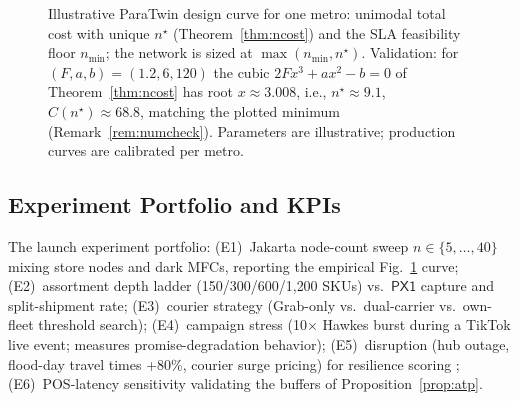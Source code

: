 \documentclass[journal]{IEEEtran}
\begin{document}
\begin{figure}[!t]
\centering
{}
\caption{Illustrative ParaTwin design curve for one metro: unimodal total cost with unique $n^\star$ (Theorem~\ref{thm:ncost}) and the SLA feasibility floor $n_{\min}$; the network is sized at $\max(n_{\min}, n^\star)$. Validation: for $(F,a,b)=(1.2,6,120)$ the cubic $2Fx^3 + ax^2 - b = 0$ of Theorem~\ref{thm:ncost} has root $x \approx 3.008$, i.e., $n^\star \approx 9.1$, $C(n^\star) \approx 68.8$, matching the plotted minimum (Remark~\ref{rem:numcheck}). Parameters are illustrative; production curves are calibrated per metro.}
\label{fig:costcurve}
\end{figure}

\subsection{Experiment Portfolio and KPIs}
The launch experiment portfolio: (E1)~Jakarta node-count sweep $n \in \{5,\dots,40\}$ mixing store nodes and dark MFCs, reporting the empirical Fig.~\ref{fig:costcurve} curve; (E2)~assortment depth ladder (150/300/600/1{,}200 SKUs) vs.\ $\mathsf{PX1}$ capture and split-shipment rate; (E3)~courier strategy (Grab-only vs.\ dual-carrier vs.\ own-fleet threshold search); (E4)~campaign stress (10$\times$ Hawkes burst during a TikTok live event; measures promise-degradation behavior); (E5)~disruption (hub outage, flood-day travel times +80\%, courier surge pricing) for resilience scoring \cite{ivanov}; (E6)~POS-latency sensitivity validating the buffers of Proposition~\ref{prop:atp}.
\end{document}

